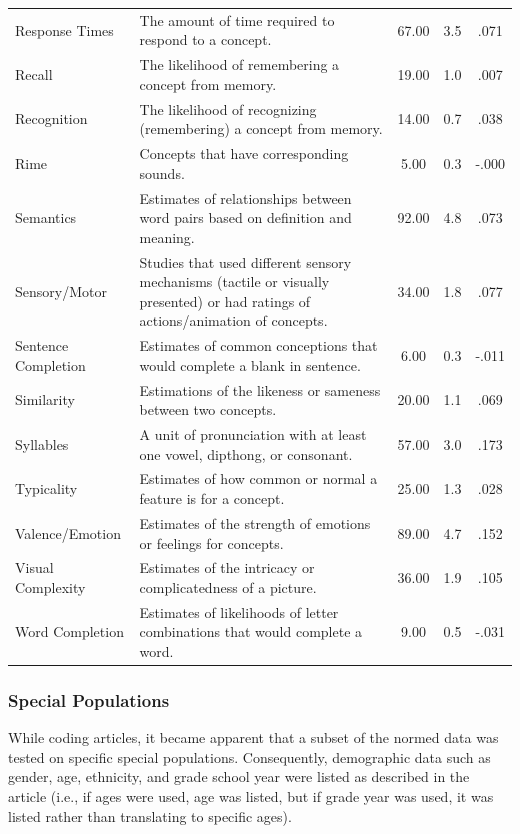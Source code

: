 \documentclass[english,man]{apa6}
\theoremstyle{definition}
\theoremstyle{definition}
\theoremstyle{definition}
\theoremstyle{remark}
\begin{document}
\begin{table}[tbp]
\begin{center}
\begin{threeparttable}
\begin{tabular}{llccc}
Response Times & The amount of time required to respond to a concept. & 67.00 & 3.5 & .071\\
Recall & The likelihood of remembering a concept from memory. & 19.00 & 1.0 & .007\\
Recognition & The likelihood of recognizing (remembering) a concept from memory. & 14.00 & 0.7 & .038\\
Rime & Concepts that have corresponding sounds. & 5.00 & 0.3 & -.000\\
Semantics & Estimates of relationships between word pairs based on definition and meaning. & 92.00 & 4.8 & .073\\
Sensory/Motor & Studies that used different sensory mechanisms (tactile or visually presented) or had ratings of actions/animation of concepts. & 34.00 & 1.8 & .077\\
Sentence Completion & Estimates of common conceptions that would complete a blank in sentence. & 6.00 & 0.3 & -.011\\
Similarity & Estimations of the likeness or sameness between two concepts. & 20.00 & 1.1 & .069\\
Syllables & A unit of pronunciation with at least one vowel, dipthong, or consonant. & 57.00 & 3.0 & .173\\
Typicality & Estimates of how common or normal a feature is for a concept. & 25.00 & 1.3 & .028\\
Valence/Emotion & Estimates of the strength of emotions or feelings for concepts. & 89.00 & 4.7 & .152\\
Visual Complexity & Estimates of the intricacy or complicatedness of a picture. & 36.00 & 1.9 & .105\\
Word Completion & Estimates of likelihoods of letter combinations that would complete a word. & 9.00 & 0.5 & -.031\\
\bottomrule
\end{tabular}
\end{threeparttable}
\end{center}
\end{table}

\subsubsection{Special Populations}\label{special-populations}

While coding articles, it became apparent that a subset of the normed
data was tested on specific special populations. Consequently,
demographic data such as gender, age, ethnicity, and grade school year
were listed as described in the article (i.e., if ages were used, age
was listed, but if grade year was used, it was listed rather than
translating to specific ages).
\end{document}
